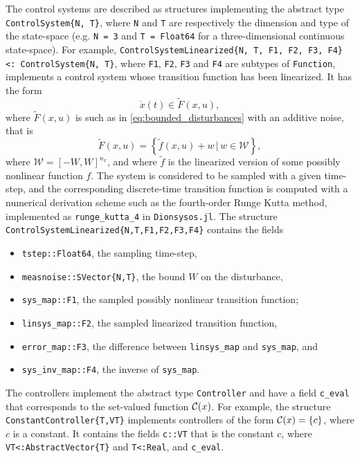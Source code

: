 \documentclass{juliacon}
\begin{document}
The control systems are described as structures implementing the abstract type \texttt{ControlSystem\{N, T\}}, where \texttt{N} and \texttt{T} are respectively the dimension and type of the state-space (e.g. \texttt{N = 3} and \texttt{T = Float64} for a three-dimensional continuous state-space). For example, \texttt{ControlSystemLinearized\{N, T, F1, F2, F3, F4\} <: ControlSystem\{N, T\}}, where \texttt{F1}, \texttt{F2}, \texttt{F3} and \texttt{F4} are subtypes of \texttt{Function}, implements a control system whose transition function has been linearized. It has the form
\begin{equation}
    \dot{x}(t) \in \tilde{F}(x, u), 
\end{equation}
where $\tilde{F}(x, u)$ is such as in \eqref{eq:bounded_disturbances} with an additive noise, that is
\begin{equation}
    \tilde{F}(x, u) = \left\{\tilde{f}(x, u) + w \, | \, w \in \mathcal{W}\right\}, 
\end{equation}
where $\mathcal{W} = [-W, W]^{n_x}$, and where $\tilde{f}$ is the linearized version of some possibly nonlinear function $f$. The system is considered to be sampled with a given time-step, and the corresponding discrete-time transition function is computed with a numerical derivation scheme such as the fourth-order Runge Kutta method, implemented as 
\texttt{runge_kutta_4} in \texttt{Dionsysos.jl}. The structure \texttt{ControlSystemLinearized\{N,T,F1,F2,F3,F4\}} contains the fields
\begin{itemize}
    \item \texttt{tstep::Float64}, the sampling time-step,  
    \item \texttt{measnoise::SVector\{N,T\}}, the bound $W$ on the disturbance, 
    \item \texttt{sys\_map::F1}, the sampled possibly nonlinear transition function; 
    \item \texttt{linsys\_map::F2}, the sampled linearized transition function, 
    \item \texttt{error\_map::F3}, the difference between \texttt{linsys\_map} and \texttt{sys\_map}, and
    \item \texttt{sys\_inv\_map::F4}, the inverse of \texttt{sys\_map}.
\end{itemize} 

\vskip 6pt

The controllers implement the abstract type \texttt{Controller} and have a field \texttt{c\_eval} that corresponds to the set-valued function $\mathcal{C}(x)$. For example, the structure \texttt{ConstantController\{T,VT\}} implements controllers of the form $\mathcal{C}(x) = \{c\}$, where $c$ is a constant. It contains the fields \texttt{c::VT} that is the constant $c$, where \texttt{VT<:AbstractVector\{T\}} and \texttt{T<:Real}, and \texttt{c\_eval}.
\end{document}
